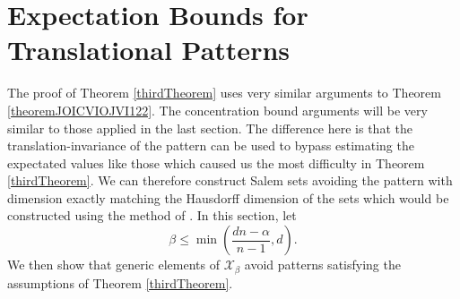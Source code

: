 \documentclass[dvipsnames,letterpaper,12pt]{article}
\numberwithin{equation}{section}
\numberwithin{theorem}{section}
\begin{document}
\section{Expectation Bounds for Translational Patterns}

The proof of Theorem \ref{thirdTheorem} uses very similar arguments to Theorem \ref{theoremJOICVIOJVI122}. The concentration bound arguments will be very similar to those applied in the last section. The difference here is that the translation-invariance of the pattern can be used to bypass estimating the expectated values like those which caused us the most difficulty in Theorem \ref{thirdTheorem}. We can therefore construct Salem sets avoiding the pattern with dimension exactly matching the Hausdorff dimension of the sets which would be constructed using the method of \cite{OurPaper}. In this section, let
%
\[ \beta \leq \min \left( \frac{dn - \alpha}{n-1}, d \right). \]
%
We then show that generic elements of $\mathcal{X}_\beta$ avoid patterns satisfying the assumptions of Theorem \ref{thirdTheorem}.
\end{document}
